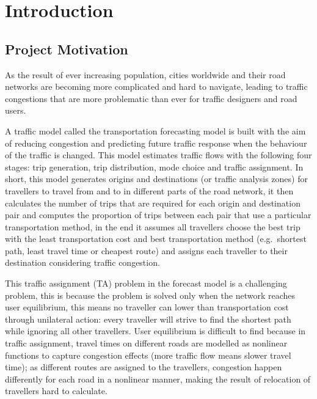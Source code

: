 \chapter{Introduction}




\section{Project Motivation}

As the result of ever increasing population,
cities worldwide and their road networks are becoming
more complicated and hard to navigate,
leading to traffic congestions that are more problematic than ever
for traffic designers and road users.

A traffic model called the transportation forecasting model is built
with the aim of reducing congestion and predicting future traffic response when the behaviour of the traffic is changed.
This model estimates traffic flows with the following four stages: trip generation,
trip distribution, mode choice and traffic assignment.  
In short,
this model generates origins and destinations (or traffic analysis zones) for travellers to travel from and to in different parts of the road network,
it then calculates the number of trips that are required for each origin and destination pair
and computes the proportion of trips between each pair that use a particular transportation method,
in the end it assumes all travellers choose the best trip with the least transportation cost and best transportation method (e.g.\ shortest path, least travel time or cheapest route) and
assigns each traveller to their destination considering traffic congestion.

This traffic assignment (TA) problem in the forecast model is a challenging problem, 
this is because the problem is solved only when the network reaches user equilibrium,
this means no traveller can lower than transportation cost through unilateral action: every traveller will strive to find the shortest path while ignoring all other travellers.
User equilibrium is difficult to find because in traffic assignment,
travel times on different roads are modelled as nonlinear functions to capture congestion effects (more traffic flow means slower travel time);
as different routes are assigned to the travellers,
congestion happen differently for each road in a nonlinear manner,
making the result of relocation of travellers hard to calculate.

